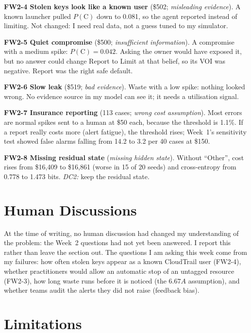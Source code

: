 \documentclass{article}
\newcommand{\Pc}{P(\mathrm{C})}
\begin{document}
\textbf{FW2-4 Stolen keys look like a known user} (\$502; \emph{misleading evidence}). A known launcher pulled $\Pc$ down to 0.081, so the agent reported instead of limiting. Not changed: I need real data, not a guess tuned to my simulator.

\textbf{FW2-5 Quiet compromise} (\$500; \emph{insufficient information}). A compromise with a medium spike: $\Pc = 0.042$. Asking the owner would have exposed it, but no answer could change Report to Limit at that belief, so its VOI was negative. Report was the right safe default.

\textbf{FW2-6 Slow leak} (\$519; \emph{bad evidence}). Waste with a low spike: nothing looked wrong. No evidence source in my model can see it; it needs a utilisation signal.

\textbf{FW2-7 Insurance reporting} (113 cases; \emph{wrong cost assumption}). Most errors are normal spikes sent to a human at \$50 each, because the threshold is 1.1\%. If a report really costs more (alert fatigue), the threshold rises; Week~1's sensitivity test showed false alarms falling from 14.2 to 3.2 per 40 cases at \$150.

\textbf{FW2-8 Missing residual state} (\emph{missing hidden state}). Without ``Other'', cost rises from \$16,409 to \$16,861 (worse in 15 of 20 seeds) and cross-entropy from 0.778 to 1.473 bits. \emph{DC2:} keep the residual state.

\section{Human Discussions}

At the time of writing, no human discussion had changed my understanding of the problem: the Week~2 questions had not yet been answered. I report this rather than leave the section out. The questions I am asking this week come from my failures: how often stolen keys appear as a known CloudTrail user (FW2-4), whether practitioners would allow an automatic stop of an untagged resource (FW2-3), how long waste runs before it is noticed (the $6.67A$ assumption), and whether teams audit the alerts they did not raise (feedback bias).

\section{Limitations}
\end{document}
